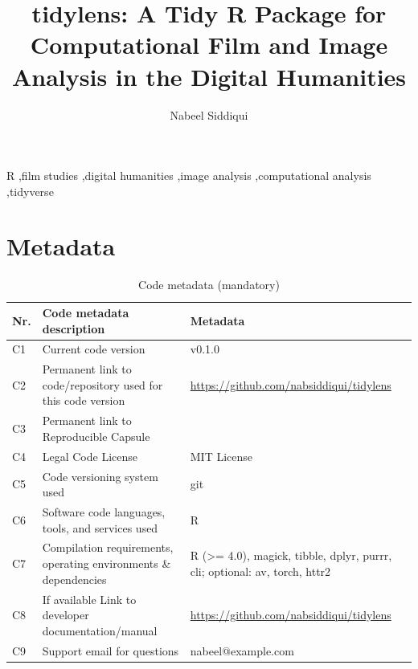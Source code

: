 \documentclass[preprint,12pt, a4paper]{elsarticle}
\begin{document}
\renewcommand{\labelenumii}{\arabic{enumi}.\arabic{enumii}}

\begin{frontmatter}

\title{tidylens: A Tidy R Package for Computational Film and Image Analysis in the Digital Humanities}

\author[label1]{Nabeel Siddiqui}
\address[label1]{Affiliation, Address}

\begin{abstract}
\end{abstract}

\begin{keyword}
R \sep film studies \sep digital humanities \sep image analysis \sep computational analysis \sep tidyverse
\end{keyword}

\end{frontmatter}


\section*{Metadata}
\label{}

\begin{table}[!h]
\begin{tabular}{|l|p{6.5cm}|p{6.5cm}|}
\hline
\textbf{Nr.} & \textbf{Code metadata description} & \textbf{Metadata} \\
\hline
C1 & Current code version & v0.1.0 \\
\hline
C2 & Permanent link to code/repository used for this code version & \url{https://github.com/nabsiddiqui/tidylens} \\
\hline
C3 & Permanent link to Reproducible Capsule & \\
\hline
C4 & Legal Code License & MIT License \\
\hline
C5 & Code versioning system used & git \\
\hline
C6 & Software code languages, tools, and services used & R \\
\hline
C7 & Compilation requirements, operating environments \& dependencies & R (>= 4.0), magick, tibble, dplyr, purrr, cli; optional: av, torch, httr2 \\
\hline
C8 & If available Link to developer documentation/manual & \url{https://github.com/nabsiddiqui/tidylens} \\
\hline
C9 & Support email for questions & nabeel@example.com \\
\hline
\end{tabular}
\caption{Code metadata (mandatory)}
\label{codeMetadata}
\end{table}
\end{document}
